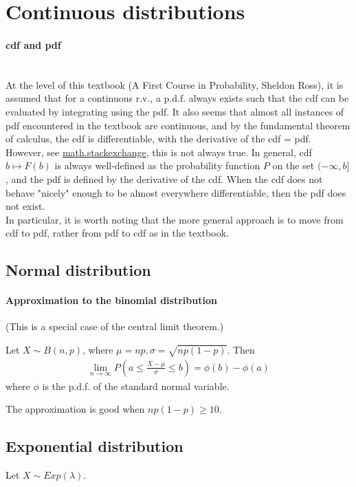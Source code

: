 \documentclass{article}
\begin{document}
\section{Continuous distributions}
\paragraph{cdf and pdf}\mbox{}\\
At the level of this textbook (A First Course in Probability, Sheldon Ross), it is assumed that for a continuous r.v., a p.d.f. always exists such that the cdf can be evaluated by integrating using the pdf. It also seems that almost all instances of pdf encountered in the textbook are continuous, and by the fundamental theorem of calculus, the cdf is differentiable, with the derivative of the cdf = pdf.\\
However, see \href{math.stackexchange.com/questions/3379661/does-a-random-variable-always-have-a-cumulative-distribution-function/3379708}{math.stackexchange}, this is not always true. In general, cdf $b\mapsto F(b)$ is always well-defined as the probability function $P$ on the set $(-\infty, b]$, and the pdf is defined by the derivative of the cdf. When the cdf does not behave "nicely" enough to be almost everywhere differentiable, then the pdf does not exist.\\
In particular, it is worth noting that the more general approach is to move from cdf to pdf, rather from pdf to cdf as in the textbook.



\subsection{Normal distribution}
\paragraph{Approximation to the binomial distribution} (This is a special case of the central limit theorem.)

Let $X\sim B(n, p)$, where $\mu = np, \sigma = \sqrt{np(1-p)}$. Then
\begin{align*}
	\lim_{n\rightarrow \infty}P(a \leq \frac{X-\mu}{\sigma} \leq b) = \phi(b) - \phi(a)
\end{align*}
where $\phi$ is the p.d.f. of the standard normal variable.

The approximation is good when $np(1-p)\geq 10$.

\subsection{Exponential distribution}
Let $X\sim Exp(\lambda)$.
\end{document}
